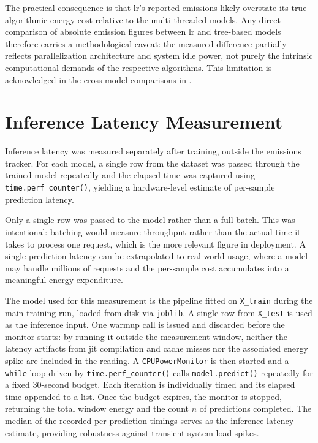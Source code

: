 The practical consequence is that \gls{lr}'s reported emissions likely overstate its true algorithmic energy cost relative to the multi-threaded models. Any direct comparison of absolute emission figures between \gls{lr} and tree-based models therefore carries a methodological caveat: the measured difference partially reflects parallelization architecture and system idle power, not purely the intrinsic computational demands of the respective algorithms. This limitation is acknowledged in the cross-model comparisons in .

\section{Inference Latency Measurement}
\label{implementation_inference}

Inference latency was measured separately after training, outside the emissions tracker. For each model, a single row from the dataset was passed through the trained model repeatedly and the elapsed time was captured using \texttt{time.perf\_counter()}, yielding a hardware-level estimate of per-sample prediction latency.

Only a single row was passed to the model rather than a full batch. This was intentional: batching would measure throughput rather than the actual time it takes to process one request, which is the more relevant figure in deployment. A single-prediction latency can be extrapolated to real-world usage, where a model may handle millions of requests and the per-sample cost accumulates into a meaningful energy expenditure.

The model used for this measurement is the pipeline fitted on \texttt{X\_train} during the main training run, loaded from disk via \texttt{joblib}. A single row from \texttt{X\_test} is used as the inference input. One warmup call is issued and discarded before the monitor starts: by running it outside the measurement window, neither the latency artifacts from \gls{jit} compilation and cache misses nor the associated energy spike are included in the reading. A \texttt{CPUPowerMonitor} is then started and a \texttt{while} loop driven by \texttt{time.perf\_counter()} calls \texttt{model.predict()} repeatedly for a fixed 30-second budget. Each iteration is individually timed and its elapsed time appended to a list. Once the budget expires, the monitor is stopped, returning the total window energy and the count $n$ of predictions completed. The median of the recorded per-prediction timings serves as the inference latency estimate, providing robustness against transient system load spikes.

